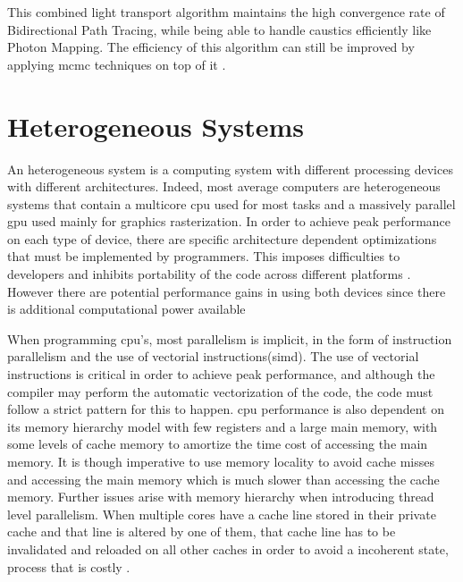This combined light transport algorithm maintains the high convergence rate of Bidirectional Path Tracing, while being able to handle caustics efficiently like Photon Mapping. The efficiency of this algorithm can still be improved by applying \gls{mcmc} techniques on top of it \citep{Georgiev}.

\section{Heterogeneous Systems}

An heterogeneous system is a computing system with different processing devices with different architectures. Indeed, most average computers are heterogeneous systems that contain a multicore \gls{cpu} used for most tasks and a massively parallel \gls{gpu} used mainly for graphics rasterization.  In order to achieve peak performance on each type of device, there are specific architecture dependent optimizations that must be implemented by programmers. This imposes difficulties to developers and inhibits portability of the code across different platforms \citep{Kunzman}. However there are potential performance gains in using both devices since there is additional computational power available

When programming \gls{cpu}'s, most parallelism is implicit, in the form of instruction parallelism and the use of vectorial instructions(\gls{simd}). The use of vectorial instructions is critical in order to achieve peak performance, and although the compiler may perform the automatic vectorization of the code, the code must follow a strict pattern for this to happen. \gls{cpu} performance is also dependent on its memory hierarchy model with few registers and a large main memory, with some levels of cache memory to amortize the time cost of accessing the main memory. It is though imperative to use memory locality to avoid cache misses and accessing the main memory which is much slower than accessing the cache memory. Further issues arise with memory hierarchy when introducing thread level parallelism. When multiple cores have a cache line stored in their private cache and that line is altered by one of them, that cache line has to be invalidated and reloaded on all other caches in order to avoid a incoherent state, process that is costly \citep{hennessy2011computer}.

